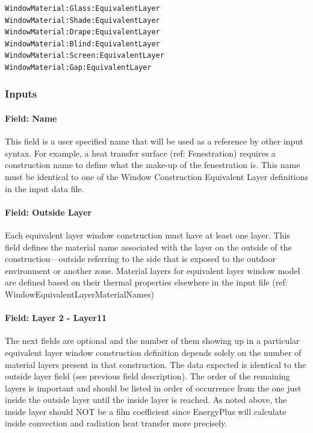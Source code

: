 \begin{lstlisting}
WindowMaterial:Glass:EquivalentLayer
WindowMaterial:Shade:EquivalentLayer
WindowMaterial:Drape:EquivalentLayer
WindowMaterial:Blind:EquivalentLayer
WindowMaterial:Screen:EquivalentLayer
WindowMaterial:Gap:EquivalentLayer
\end{lstlisting}

\subsubsection{Inputs}\label{inputs-41}

\paragraph{Field: Name}\label{field-name-35}

This field is a user specified name that will be used as a reference by other input syntax. For example, a heat transfer surface (ref: Fenestration) requires a construction name to define what the make-up of the fenestration is. This name must be identical to one of the Window Construction Equivalent Layer definitions in the input data file.

\paragraph{Field: Outside Layer}\label{field-outside-layer-2}

Each equivalent layer window construction must have at least one layer. This field defines the material name associated with the layer on the outside of the construction---outside referring to the side that is exposed to the outdoor environment or another zone. Material layers for equivalent layer window model are defined based on their thermal properties elsewhere in the input file (ref: WindowEquivalentLayerMaterialNames)

\paragraph{Field: Layer 2 - Layer11}\label{field-layer-2---layer11}

The next fields are optional and the number of them showing up in a particular equivalent layer window construction definition depends solely on the number of material layers present in that construction. The data expected is identical to the outside layer field (see previous field description). The order of the remaining layers is important and should be listed in order of occurrence from the one just inside the outside layer until the inside layer is reached. As noted above, the inside layer should NOT be a film coefficient since EnergyPlus will calculate inside convection and radiation heat transfer more precisely.


